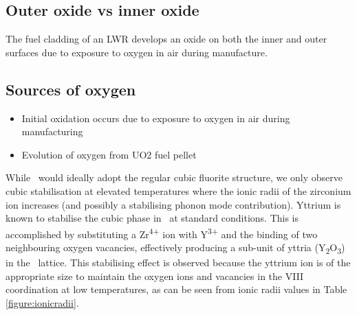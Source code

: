 \subsection{Outer oxide vs inner oxide}
The fuel cladding of an LWR develops an oxide on both the inner and outer surfaces due to exposure to oxygen in air during manufacture. 
\subsection{Sources of oxygen}

\begin{itemize}
\item Initial oxidation occurs due to exposure to oxygen in air during manufacturing
\item Evolution of oxygen from UO2 fuel pellet
\end{itemize}


While \zirconia\ would ideally adopt the regular cubic fluorite structure, we only observe cubic stabilisation at elevated temperatures where the ionic radii of the zirconium ion increases (and possibly a stabilising phonon mode contribution). Yttrium is known to stabilise the cubic phase in \zirconia\ at standard conditions. This is accomplished by substituting a Zr\textsuperscript{4+} ion with Y\textsuperscript{3+} and the binding of two neighbouring oxygen vacancies, effectively producing a sub-unit of yttria (Y\textsubscript{2}O\textsubscript{3}) in the \zirconia\ lattice. This stabilising effect is observed because the yttrium ion is of the appropriate size to maintain the oxygen ions and vacancies in the VIII coordination at low temperatures, as can be seen from ionic radii values in Table \ref{figure:ionicradii}. 


